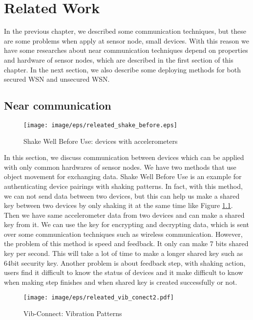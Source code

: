 \chapter{Related Work}\label{chap:related}
In the previous chapter, we described some communication techniques, but these are some problems when apply at sensor node, small devices. With this reason we have some researches about near communication techniques depend on properties and hardware of sensor nodes, which are described in the first section of this chapter. In the next section, we also describe some deploying methods for both secured WSN and unsecured WSN.%
\clearpage

\section{Near communication}\label{sec:related_near}

\begin{figure}[tb]
\centering
\texttt{[image: image/eps/releated\_shake\_before.eps]}
\caption{Shake Well Before Use: devices with accelerometers}
\label{fig:releated_shake}
\end{figure}

In this section, we discuss communication between devices which can be applied with only common hardwares of sensor nodes. We have two methods that use object movement for exchanging data. Shake Well Before Use \cite{Mayrhofer:2007:SWB:1758156.1758168} is an example for authenticating device pairings with shaking patterns. In fact, with this method, we can not send data between two devices, but this can help us make a shared key between two devices by only shaking it at the same time like Figure \ref{fig:releated_shake}. Then we have same accelerometer data from two devices and can make a shared key from it. We can use the key for encrypting and decrypting data, which is sent over some communication techniques such as wireless communication. However, the problem of this method is speed and feedback. It only can make 7 bits shared key per second. This will take a lot of time to make a longer shared key such as 64bit security key. Another problem is about feedback step, with shaking action, users find it difficult to know the status of devices and it make difficult to know when making step finishes and when shared key is created successfully or not.

\begin{figure}[tb]
\centering
\texttt{[image: image/eps/releated\_vib\_conect2.pdf]}
\caption{Vib-Connect: Vibration Patterns}
\label{fig:releated_vib}
\end{figure}


